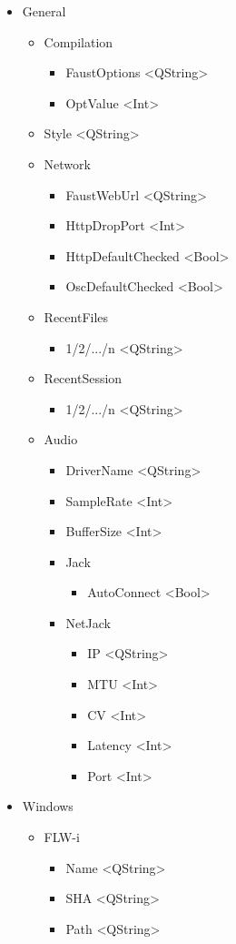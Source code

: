 \documentclass[a4paper]{article}
\begin{document}
{\begin{multicols}{2}
\begin{itemize}
\item General
	\begin{itemize}
	\item Compilation
		\begin{itemize}
		\item FaustOptions <QString>
		\item OptValue <Int>
		\end{itemize}
	\item Style <QString>
	\item Network
		\begin{itemize}
		\item FaustWebUrl <QString>
		\item HttpDropPort <Int>
		\item HttpDefaultChecked <Bool>
		\item OscDefaultChecked <Bool>
		\end{itemize}
	\item RecentFiles
		\begin{itemize}
		\item 1/2/.../n <QString>
		\end{itemize}
	\item RecentSession
		\begin{itemize}
		\item 1/2/.../n <QString>
		\end{itemize}
	\item Audio
		\begin{itemize}
		\item DriverName <QString>
		\item SampleRate <Int>
		\item BufferSize <Int>
		\item Jack
			\begin{itemize}
			\item AutoConnect <Bool>
			\end{itemize}
		\item NetJack
			\begin{itemize}
			\item IP <QString>
			\item MTU <Int>
			\item CV <Int>
			\item Latency <Int>
			\item Port <Int>
			\end{itemize}
		\end{itemize}
	\end{itemize}
\item{Windows}
	\begin{itemize}
	\item FLW-i
		\begin{itemize}
		\item Name <QString>
		\item SHA <QString>
		\item Path <QString>
		\end{itemize}
	\end{itemize}
\end{itemize}
\end{multicols}

}
\end{document}
